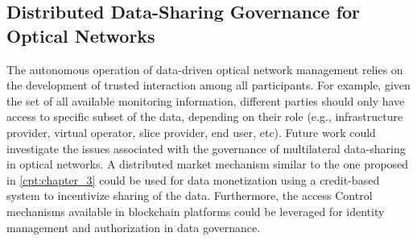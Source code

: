 



\subsection{Distributed Data-Sharing Governance for Optical Networks}
The autonomous operation of data-driven optical network management relies on the development of trusted interaction among all participants. For example, given the set of all available monitoring information, different parties should only have access to specific subset of the data, depending on their role (e.g., infrastructure provider, virtual operator, slice provider, end user, etc). Future work could investigate the issues associated with the governance of multilateral data-sharing in optical networks. A distributed market mechanism similar to the one proposed in \autoref{cpt:chapter_3} could be used for data monetization using a credit-based system to incentivize sharing of the data. Furthermore, the access Control mechanisms available in blockchain platforms could be leveraged for identity management and authorization in data governance.
\vfill


